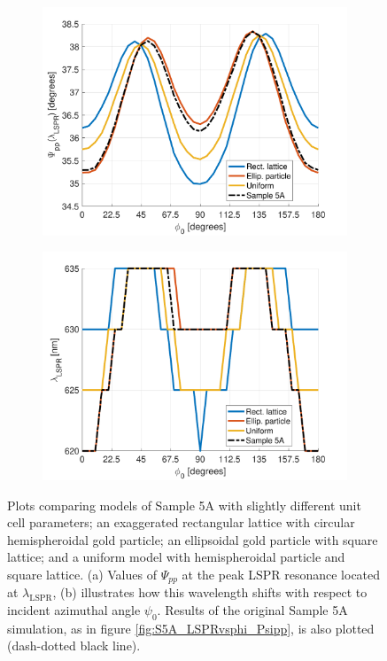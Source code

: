 \begin{figure}[h]
    \begin{subfigure}{0.5\textwidth}
        \centering
        \includegraphics[width=\linewidth]{figures/ch4/S5A/comparisons/comparisons_Psipp_at_LSPR.pdf}
        \caption{}
        \label{}
    \end{subfigure}
    \begin{subfigure}{0.5\textwidth}
        \centering
        \includegraphics[width=\linewidth]{figures/ch4/S5A/comparisons/comparisons_wl@LSPR.pdf}
        \caption{}
        \label{}
    \end{subfigure}
    \caption{Plots comparing models of Sample 5A with slightly different unit cell parameters; an exaggerated rectangular lattice with circular hemispheroidal gold particle; an ellipsoidal gold particle with square lattice; and a uniform model with hemispheroidal particle and square lattice. (a) Values of $\Psi_{pp}$ at the peak LSPR resonance located at $\lambda_{\text{LSPR}}$, (b) illustrates how this wavelength shifts with respect to incident azimuthal angle $\psi_0$. Results of the original Sample 5A simulation, as in figure \ref{fig:S5A_LSPRvsphi_Psipp}, is also plotted (dash-dotted black line).}
    \label{fig:S5A_comparisons_Psipp@LSPR}
\end{figure}
